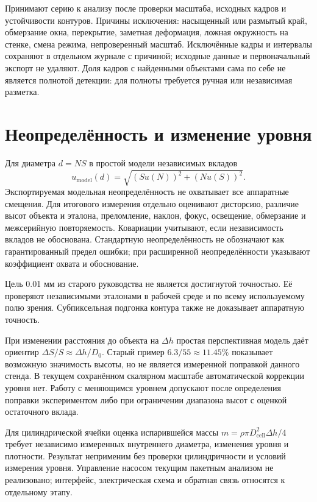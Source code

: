 \documentclass[12pt,a4paper]{article}
\begin{document}
Принимают серию к анализу после проверки масштаба, исходных кадров и устойчивости контуров. Причины исключения: насыщенный или размытый край, обмерзание окна, перекрытие, заметная деформация, ложная окружность на стенке, смена режима, непроверенный масштаб. Исключённые кадры и интервалы сохраняют в отдельном журнале с причиной; исходные данные и первоначальный экспорт не удаляют. Доля кадров с найденными объектами сама по себе не является полнотой детекции: для полноты требуется ручная или независимая разметка.

\section{Неопределённость и изменение уровня}
Для диаметра $d=NS$ в простой модели независимых вкладов
\[
u_{\mathrm{model}}(d)=\sqrt{(S u(N))^2+(N u(S))^2}.
\]
Экспортируемая модельная неопределённость не охватывает все аппаратные смещения. Для итогового измерения отдельно оценивают дисторсию, различие высот объекта и эталона, преломление, наклон, фокус, освещение, обмерзание и межсерийную повторяемость. Ковариации учитывают, если независимость вкладов не обоснована. Стандартную неопределённость не обозначают как гарантированный предел ошибки; при расширенной неопределённости указывают коэффициент охвата и обоснование.

Цель 0.01 мм из старого руководства не является достигнутой точностью. Её проверяют независимыми эталонами в рабочей среде и по всему используемому полю зрения. Субпиксельная подгонка контура также не доказывает аппаратную точность.

При изменении расстояния до объекта на $\Delta h$ простая перспективная модель даёт ориентир $\Delta S/S\approx\Delta h/D_0$. Старый пример $6.3/55\approx11.45\%$ показывает возможную значимость высоты, но не является измеренной поправкой данного стенда. В текущем сохранённом скалярном масштабе автоматической коррекции уровня нет. Работу с меняющимся уровнем допускают после определения поправки экспериментом либо при ограничении диапазона высот с оценкой остаточного вклада.

Для цилиндрической ячейки оценка испарившейся массы $m=\rho\pi D_{\mathrm{cell}}^2\Delta h/4$ требует независимо измеренных внутреннего диаметра, изменения уровня и плотности. Результат неприменим без проверки цилиндричности и условий измерения уровня. Управление насосом текущим пакетным анализом не реализовано; интерфейс, электрическая схема и обратная связь относятся к отдельному этапу.
\end{document}
